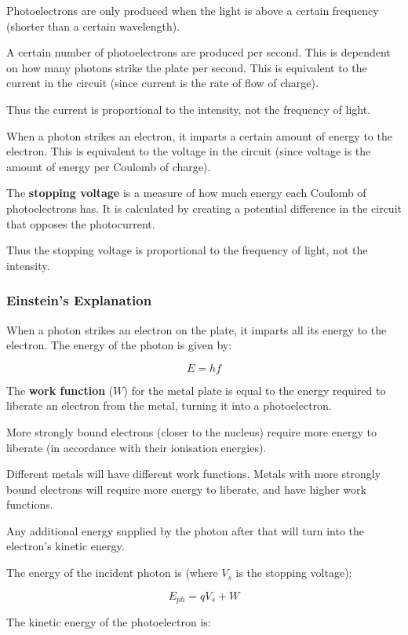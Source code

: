 \documentclass[a4paper,11pt]{report}
\begin{document}
Photoelectrons are only produced when the light is above a certain frequency
(shorter than a certain wavelength).

A certain number of photoelectrons are produced per second. This is dependent
on how many photons strike the plate per second. This is equivalent to the
current in the circuit (since current is the rate of flow of charge).

Thus the current is proportional to the intensity, not the frequency of light.

When a photon strikes an electron, it imparts a certain amount of energy to
the electron. This is equivalent to the voltage in the circuit (since voltage
is the amount of energy per Coulomb of charge).

The \textbf{stopping voltage} is a measure of how much energy each Coulomb of
photoelectrons has. It is calculated by creating a potential difference in the
circuit that opposes the photocurrent.

Thus the stopping voltage is proportional to the frequency of light, not the
intensity.

\subsubsection{Einstein's Explanation}

When a photon strikes an electron on the plate, it imparts all its energy to
the electron. The energy of the photon is given by:

$$
E = hf
$$

The \textbf{work function} ($W$) for the metal plate is equal to the energy
required to liberate an electron from the metal, turning it into a
photoelectron.

More strongly bound electrons (closer to the nucleus) require more energy to
liberate (in accordance with their ionisation energies).

Different metals will have different work functions. Metals with more strongly
bound electrons will require more energy to liberate, and have higher work
functions.

Any additional energy supplied by the photon after that will turn into the
electron's kinetic energy.

The energy of the incident photon is (where $V_s$ is the stopping voltage):

$$
E_{ph} = qV_s + W
$$

The kinetic energy of the photoelectron is:
\end{document}
